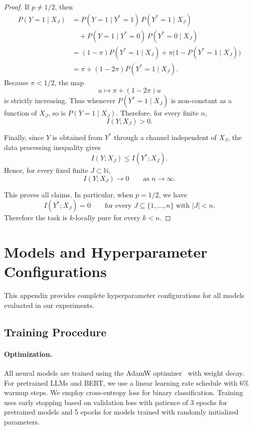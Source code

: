 \documentclass{article}
\theoremstyle{plain}
\theoremstyle{definition}
\theoremstyle{remark}
\begin{document}
\begin{proof}
If \(p\neq 1/2\), then
\begin{align*}
P(Y=1\mid X_J)
&=
P(Y=1\mid Y^*=1)\,P(Y^*=1\mid X_J) \\
&\quad +
P(Y=1\mid Y^*=0)\,P(Y^*=0\mid X_J) \\
&=
(1-\pi)P(Y^*=1\mid X_J)
+
\pi\bigl(1-P(Y^*=1\mid X_J)\bigr) \\
&=
\pi + (1-2\pi)P(Y^*=1\mid X_J).
\end{align*}
Because \(\pi<1/2\), the map
\[
u \mapsto \pi + (1-2\pi)u
\]
is strictly increasing. Thus whenever \(P(Y^*=1\mid X_J)\) is non-constant as a
function of \(X_J\), so is \(P(Y=1\mid X_J)\). Therefore, for every finite \(n\),
\[
I(Y;X_J)>0.
\]

Finally, since \(Y\) is obtained from \(Y^*\) through a channel independent of \(X_J\),
the data processing inequality gives
\[
I(Y;X_J)\le I(Y^*;X_J).
\]
Hence, for every fixed finite \(J\subset\mathbb N\),
\[
I(Y;X_J)\to 0
\qquad\text{as } n\to\infty.
\]

This proves all claims. In particular, when \(p=1/2\), we have
\[
I(Y^*;X_J)=0
\qquad
\text{for every } J\subseteq \{1,\ldots,n\}\text{ with } |J|<n.
\]
Therefore the task is \(k\)-locally pure for every \(k<n\).
\end{proof}

\section{Models and Hyperparameter Configurations}
\label{appendix:training}

This appendix provides complete hyperparameter configurations for all models evaluated in our experiments.

\subsection{Training Procedure}
\label{subsec:training_appendix}

\paragraph{Optimization.}
All neural models are trained using the AdamW optimizer~\citep{AdamW} with weight decay. For pretrained LLMs and BERT, we use a linear learning rate schedule with 6\% warmup steps. We employ cross-entropy loss for binary classification. Training uses early stopping based on validation loss with patience of 3 epochs for pretrained models and 5 epochs for models trained with randomly initialized parameters.
\end{document}

